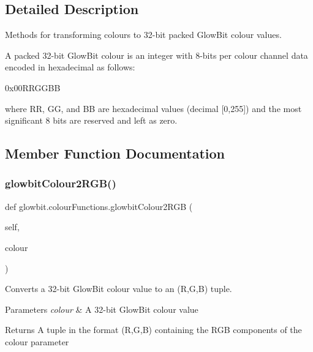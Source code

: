 \subsection{Detailed Description}
Methods for transforming colours to 32-\/bit packed Glow\+Bit colour values. 

A packed 32-\/bit Glow\+Bit colour is an integer with 8-\/bits per colour channel data encoded in hexadecimal as follows\+:

0x00\+R\+R\+G\+G\+BB

where RR, GG, and BB are hexadecimal values (decimal \mbox{[}0,255\mbox{]}) and the most significant 8 bits are reserved and left as zero. 

\subsection{Member Function Documentation}
\mbox{\label{classglowbit_1_1colourFunctions_a6f887561ea3261440350ac3b1df4a259}} 
\subsubsection{\texorpdfstring{glowbit\+Colour2\+R\+G\+B()}{glowbitColour2RGB()}}
{\footnotesize\ttfamily def glowbit.\+colour\+Functions.\+glowbit\+Colour2\+R\+GB (\begin{DoxyParamCaption}\item[{}]{self,  }\item[{}]{colour }\end{DoxyParamCaption})}



Converts a 32-\/bit Glow\+Bit colour value to an (R,G,B) tuple. 


\begin{DoxyParams}{Parameters}
{\em colour} & A 32-\/bit Glow\+Bit colour value \\
\hline
\end{DoxyParams}
\begin{DoxyReturn}{Returns}
A tuple in the format (R,G,B) containing the R\+GB components of the colour parameter 
\end{DoxyReturn}
\mbox{\label{classglowbit_1_1colourFunctions_a1c24f694a16f3c721a0e7771740ebc56}} 
